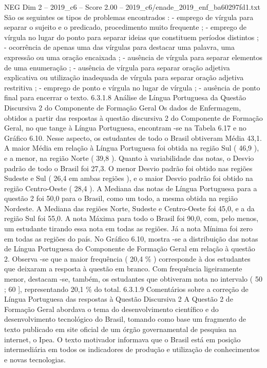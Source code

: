 \begin{textsample}{NEG Dim 2 – 2019\_c6 – Score 2.00 – 2019\_c6/enade\_2019\_enf\_ba60297fd1.txt}
São os seguintes os tipos de problemas encontrados : - emprego de vírgula para separar o sujeito e o predicado, procedimento muito frequente ; - emprego de vírgula no lugar do ponto para separar ideias que constituem períodos distintos ; - ocorrência de apenas uma das vírgulas para destacar uma palavra, uma expressão ou uma oração encaixada ; - ausência de vírgula para separar elementos de uma enumeração ; - ausência de vírgula para separar oração adjetiva explicativa ou utilização inadequada de vírgula para separar oração adjetiva restritiva ; - emprego de ponto e vírgula no lugar de vírgula ; - ausência de ponto final para encerrar o texto. 6.3.1.8 Análise de Língua Portuguesa da Questão Discursiva 2 do Componente de Formação Geral Os dados de Enfermagem, obtidos a partir das respostas à questão discursiva 2 do Componente de Formação Geral, no que tange à Língua Portuguesa, encontram -se na Tabela 6.17 e no Gráfico 6.10.
Nesse aspecto, os estudantes de todo o Brasil obtiveram Média 43,1.
A maior Média em relação à Língua Portuguesa foi obtida na região Sul ( 46,9 ), e a menor, na região Norte ( 39,8 ).
Quanto à variabilidade das notas, o Desvio padrão de todo o Brasil foi 27,3.
O menor Desvio padrão foi obtido nas regiões Sudeste e Sul ( 26,4 em ambas regiões ), e o maior Desvio padrão foi obtido na região Centro-Oeste ( 28,4 ).
A Mediana das notas de Língua Portuguesa para a questão 2 foi 50,0 para o Brasil, como um todo, a mesma obtida na região Nordeste.
A Mediana das regiões Norte, Sudeste e Centro-Oeste foi 45,0, e a da região Sul foi 55,0.
A nota Máxima para todo o Brasil foi 90,0, com, pelo menos, um estudante tirando essa nota em todas as regiões.
Já a nota Mínima foi zero em todas as regiões do país.
No Gráfico 6.10, mostra -se a distribuição das notas de Língua Portuguesa do Componente de Formação Geral em relação à questão 2.
Observa -se que a maior frequência ( 20,4 \% ) corresponde à dos estudantes que deixaram a resposta à questão em branco.
Com frequência ligeiramente menor, destacam -se, também, os estudantes que obtiveram nota no intervalo ( 50 ; 60 ], representando 20,1 \% do total. 6.3.1.9 Comentários sobre a correção de Língua Portuguesa das respostas à Questão Discursiva 2 A Questão 2 de Formação Geral abordava o tema do desenvolvimento científico e do desenvolvimento tecnológico do Brasil, tomando como base um fragmento de texto publicado em site oficial de um órgão governamental de pesquisa na internet, o Ipea.
O texto motivador informava que o Brasil está em posição intermediária em todos os indicadores de produção e utilização de conhecimentos e novas tecnologias.

\end{textsample}
